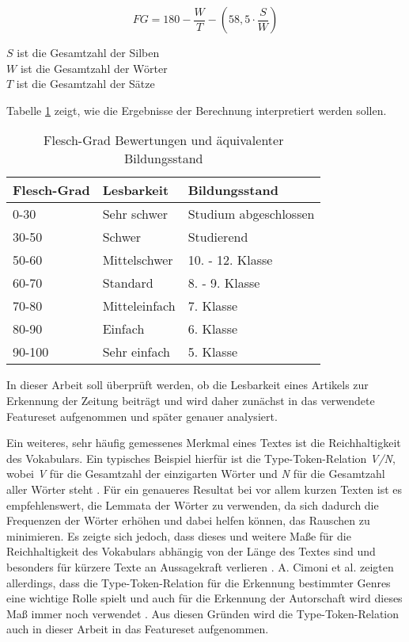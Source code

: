 \[ FG = 180 - \frac{W}{T} - (58,5 \cdot \frac{S}{W}) \]

$ S $ ist die Gesamtzahl der Silben\\
$ W $ ist die Gesamtzahl der Wörter\\
$ T $ ist die Gesamtzahl der Sätze

Tabelle \ref{fleschgrad} zeigt, wie die Ergebnisse der Berechnung interpretiert werden sollen.

\begin{table}[h]
\centering
\begin{spacing}{1.25}
\begin{tabular}[t]{lll}
\toprule
Flesch-Grad & Lesbarkeit & Bildungsstand\\
\midrule
0-30 & Sehr schwer & Studium abgeschlossen\\
30-50 & Schwer & Studierend\\
50-60 & Mittelschwer & 10. - 12. Klasse\\
60-70 & Standard & 8. - 9. Klasse\\
70-80 & Mitteleinfach & 7. Klasse\\
80-90 & Einfach & 6. Klasse\\
90-100 & Sehr einfach & 5. Klasse\\
\bottomrule
\end{tabular}
\caption{Flesch-Grad Bewertungen und äquivalenter Bildungsstand \cite[S.~406]{courtis2002reading}}
\label{fleschgrad}
\end{spacing}
\end{table}

In dieser Arbeit soll überprüft werden, ob die Lesbarkeit eines Artikels zur Erkennung der Zeitung beiträgt und wird daher zunächst in das verwendete Featureset aufgenommen und später genauer analysiert.

Ein weiteres, sehr häufig gemessenes Merkmal eines Textes ist die Reichhaltigkeit des Vokabulars. Ein typisches Beispiel hierfür ist die Type-Token-Relation \textit{V/N}, wobei \textit{V} für die Gesamtzahl der einzigarten Wörter und \textit{N} für die Gesamtzahl aller Wörter steht \cite[S.~540]{stamatatos2009survey}. Für ein genaueres Resultat bei vor allem kurzen Texten ist es empfehlenswert, die Lemmata der Wörter zu verwenden, da sich dadurch die Frequenzen der Wörter erhöhen und dabei helfen können, das Rauschen zu minimieren. Es zeigte sich jedoch, dass dieses und weitere Maße für die Reichhaltigkeit des Vokabulars abhängig von der Länge des Textes sind und besonders für kürzere Texte an Aussagekraft verlieren \cite{tweedie1998variable}. A. Cimoni et al. zeigten allerdings, dass die Type-Token-Relation für die Erkennung bestimmter Genres eine wichtige Rolle spielt \cite[S.~5]{cimino2017identifying} und auch für die Erkennung der Autorschaft wird dieses Maß immer noch verwendet \cite[S.~540]{stamatatos2009survey}. Aus diesen Gründen wird die Type-Token-Relation auch in dieser Arbeit in das Featureset aufgenommen.

